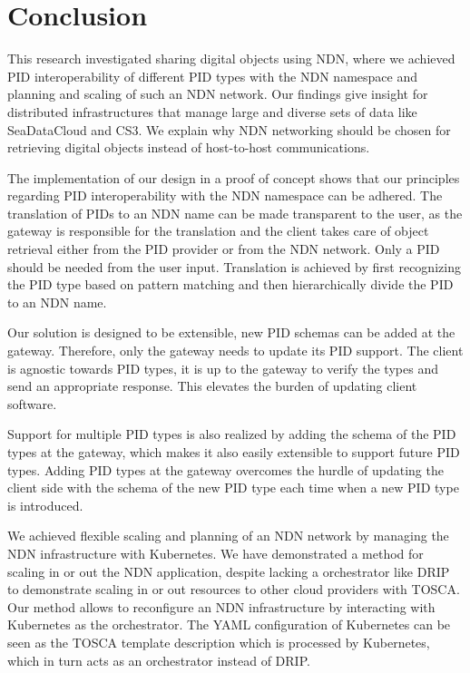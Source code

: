 \section{Conclusion}\label{conc}
This research investigated sharing digital objects using NDN, where we achieved PID interoperability of different PID types with the NDN namespace and planning and scaling of such an NDN network. 
Our findings give insight for distributed infrastructures that manage large and diverse sets of data like SeaDataCloud and CS3. We explain why NDN networking should be chosen for retrieving digital objects instead of host-to-host communications.

The implementation of our design in a proof of concept shows that our principles regarding PID interoperability with the NDN namespace can be adhered. The translation of PIDs to an NDN name can be made transparent to the user, as the gateway is responsible for the translation and the client takes care of object retrieval either from the PID provider or from the NDN network. Only a PID should be needed from the user input. Translation is achieved by first recognizing the PID type based on pattern matching and then hierarchically divide the PID to an NDN name. 

Our solution is designed to be extensible, new PID schemas can be added at the gateway. Therefore, only the gateway needs to update its PID support. The client is agnostic towards PID types, 
it is up to the gateway to verify the types 
and send an appropriate response. This elevates the burden of updating client software.

Support for multiple PID types is also realized by adding the schema of the PID types at the gateway, which makes it also easily extensible to support future PID types. Adding PID types at the gateway overcomes the hurdle of updating the client side with the schema of the new PID type each time when a new PID type is introduced.

We achieved flexible scaling and planning of an NDN network by managing the NDN infrastructure with Kubernetes. We have demonstrated a method for scaling in or out the NDN application, despite lacking a orchestrator like DRIP to demonstrate scaling in or out resources to other cloud providers with TOSCA. Our method allows to reconfigure an NDN infrastructure 
by interacting with Kubernetes as the orchestrator. The YAML configuration of Kubernetes can be seen as the TOSCA template description which is processed by Kubernetes, which in turn acts as an orchestrator instead of DRIP.

